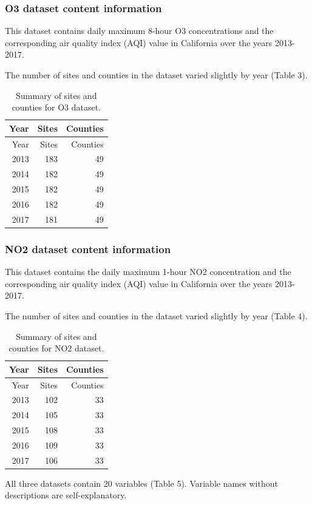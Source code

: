 \documentclass[12pt,]{article}
\begin{document}
\hypertarget{o3-dataset-content-information}{%
\subsubsection{O3 dataset content
information}\label{o3-dataset-content-information}}

This dataset contains daily maximum 8-hour O3 concentrations and the
corresponding air quality index (AQI) value in California over the years
2013-2017.

The number of sites and counties in the dataset varied slightly by year
(Table 3).

\begin{longtable}[]{@{}rrr@{}}
\caption{Summary of sites and counties for O3 dataset.}\tabularnewline
\toprule
Year & Sites & Counties\tabularnewline
\midrule
\endfirsthead
\toprule
Year & Sites & Counties\tabularnewline
\midrule
\endhead
2013 & 183 & 49\tabularnewline
2014 & 182 & 49\tabularnewline
2015 & 182 & 49\tabularnewline
2016 & 182 & 49\tabularnewline
2017 & 181 & 49\tabularnewline
\bottomrule
\end{longtable}

\hypertarget{no2-dataset-content-information}{%
\subsubsection{NO2 dataset content
information}\label{no2-dataset-content-information}}

This dataset contains the daily maximum 1-hour NO2 concentration and the
corresponding air quality index (AQI) value in California over the years
2013-2017.

The number of sites and counties in the dataset varied slightly by year
(Table 4).

\begin{longtable}[]{@{}rrr@{}}
\caption{Summary of sites and counties for NO2 dataset.}\tabularnewline
\toprule
Year & Sites & Counties\tabularnewline
\midrule
\endfirsthead
\toprule
Year & Sites & Counties\tabularnewline
\midrule
\endhead
2013 & 102 & 33\tabularnewline
2014 & 105 & 33\tabularnewline
2015 & 108 & 33\tabularnewline
2016 & 109 & 33\tabularnewline
2017 & 106 & 33\tabularnewline
\bottomrule
\end{longtable}

All three datasets contain 20 variables (Table 5). Variable names
without descriptions are self-explanatory.
\end{document}
